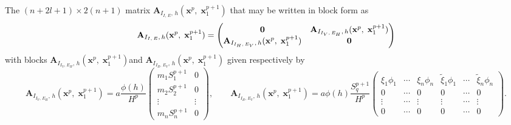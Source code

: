 \documentclass[a4paper]{article}
\newcommand{\mb}{\mathbf}
\begin{document}
{\noindent The  $(n+2l+1)\times 2(n+1)$ matrix  $ \mathbf A_{I_{I,\,E},\,h}(\mathbf x^p,\;\mathbf x_1^{p+1})$ that may be written in block form as $$ \mb A_{I_{I,\,E},\,h}(\mathbf x^p,\;\mathbf x_1^{p+1}) = \begin{pmatrix}\mb 0 & \mb A_{I_{I_V,\,E_H},\,h}(\mathbf x^p,\;\mathbf x_1^{p+1})\cr \mb A_{I_{I_H,\,E_V},\,h}(\mathbf x^p,\;\mathbf x_1^{p+1}) & \mb 0\end{pmatrix}$$ with blocks $\mb A_{I_{I_V,\,E_H},\,h}(\mathbf x^p,\;\mathbf x_1^{p+1})$and $\mb A_{I_{I_H,\,E_V},\,h}(\mathbf x^p,\;\mathbf x_1^{p+1})$  given respectively by
$$
\mathbf A_{I_{I_V,\,E_H},\,h}(\mathbf x^p,\;\mathbf x_1^{p+1})= a\frac{\phi(h)}{H^p}\left(\begin{array}{cc}m_1S_1^{p+1}&0\\  m_2S_2^{p+1}&0\\\vdots&\vdots\\  m_nS_n^{p+1}&0\end{array}\right), \qquad \mathbf A_{I_{I_H,\,E_V},\,h}(\mathbf x^p,\;\mathbf x_1^{p+1})= a\phi(h)\frac{S^{p+1}_q}{H^p}\begin{pmatrix}\xi_1\phi_1&\cdots & \xi_n\phi_n & \widetilde\xi_1\phi_1&\cdots & \widetilde\xi_n\phi_n\\0 & \cdots&0 & 0 & \cdots&0\\\vdots&\cdots&\vdots & \vdots&\cdots&\vdots\\0 & \cdots&0 & 0 & \cdots&0\end{pmatrix}.
$$

}
\end{document}
